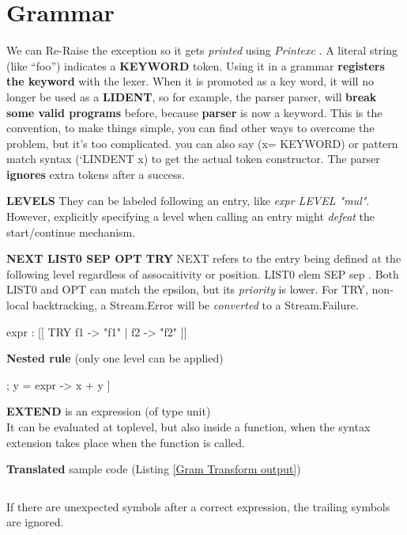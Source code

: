 \section{Grammar}

We can Re-Raise the exception so it gets \textit{printed} using \textit{Printexc} .  A literal string (like ``foo'') indicates a \textbf{KEYWORD} token. Using it in a grammar \textbf{registers the keyword} with the lexer. When it is promoted as a key word, it will no longer be used as a \textbf{LIDENT}, so for example, the parser parser, will \textbf{break some valid programs} before, because \textbf{parser} is now a keyword. This is the convention, to make things simple, you can find other ways to overcome the problem, but it's too complicated. you can also say (x= KEYWORD) or pattern match syntax (`LINDENT x) to get the actual token constructor. The parser \textbf{ignores} extra tokens after a success.


\textbf{LEVELS}  They can be labeled following an entry, like \textit{expr
  LEVEL "mul"}. However, explicitly specifying a level when calling an
entry might \textit{defeat} the start/continue mechanism.

\textbf{NEXT LIST0 SEP OPT TRY} NEXT refers to the entry being defined at the following level  regardless of assocaitivity or position.
  LIST0 elem SEP sep .
  Both LIST0 and OPT can match the epsilon, but its \textit{priority} is lower.
  For TRY, non-local backtracking, a Stream.Error will be \textit{converted} to
  a Stream.Failure.
  \begin{ocamlcode}
    expr : [[ TRY f1 -> "f1" | f2 -> "f2" ]]
  \end{ocamlcode}
  
\textbf{Nested rule} (only one level  can be applied)
  \begin{ocamlcode}
    [x = expr ; ["+" | "plus" ]; y = expr -> x + y ]
  \end{ocamlcode}
  
\textbf{EXTEND} is an expression (of type unit) \\
It can be evaluated at toplevel, but also inside a function, when
the syntax extension takes place when the function is called.

\textbf{Translated} sample code   (Listing \ref{Gram Transform output})
\inputminted[fontsize=\scriptsize]{ocaml}{code/camlp4/extend_trans/first.ml}
If there are unexpected symbols after a correct expression, the trailing symbols are ignored.

